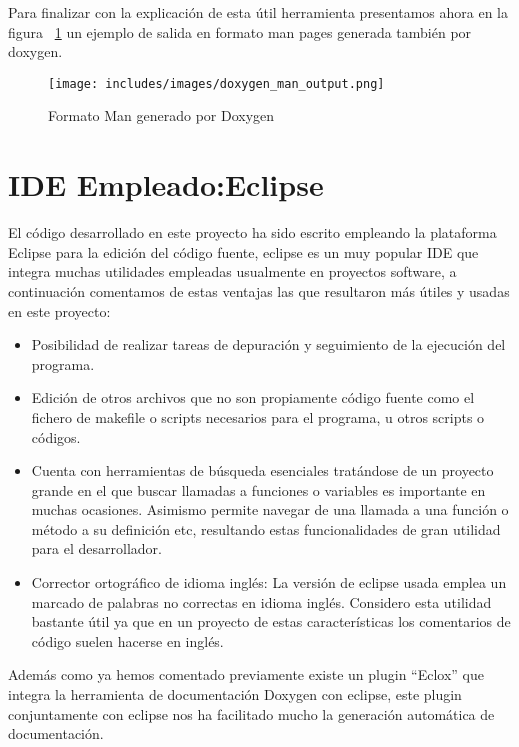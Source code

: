 Para finalizar con la explicación de esta útil herramienta  presentamos ahora en la figura ~\ref{fig:manpagesDoxygen} un ejemplo de salida en formato man pages generada también por doxygen.

\begin{figure}[t]
\centering
\texttt{[image: includes/images/doxygen\_man\_output.png]}
\caption{Formato Man generado por Doxygen}
\label{fig:manpagesDoxygen}
\end{figure}


\section{IDE Empleado:Eclipse}

El código desarrollado en este proyecto ha sido escrito empleando la plataforma Eclipse para la edición del código fuente, eclipse es un muy popular IDE que integra muchas utilidades empleadas usualmente en proyectos software, a continuación comentamos de estas ventajas las que resultaron más útiles y usadas en este proyecto:

\begin{itemize}

\item Posibilidad de realizar tareas de depuración y seguimiento de la ejecución del programa.

\item Edición de otros archivos que no son propiamente código fuente como el fichero de makefile o scripts necesarios para el programa, u otros scripts o códigos.


\item Cuenta con herramientas de búsqueda esenciales tratándose de un proyecto grande en el que buscar llamadas a funciones o variables es importante en muchas ocasiones. Asimismo permite navegar de una llamada a una función o método a su definición etc, resultando estas funcionalidades de gran utilidad para el desarrollador.

\item Corrector ortográfico de idioma inglés: La versión de eclipse usada emplea un marcado de palabras no correctas en idioma inglés. Considero esta utilidad bastante útil ya que en un proyecto de estas características los comentarios de código suelen hacerse en inglés.

\end{itemize}

Además como ya hemos comentado previamente existe un plugin “Eclox” que integra la herramienta de documentación Doxygen con eclipse, este plugin conjuntamente con eclipse nos ha facilitado mucho la generación automática de documentación.

